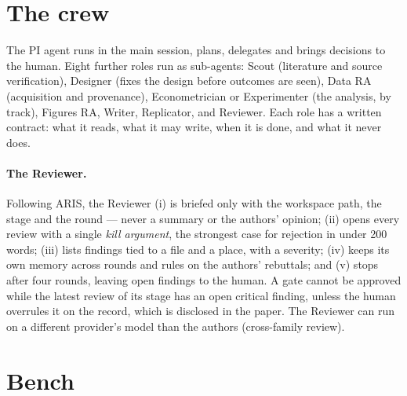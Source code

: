 \documentclass[11pt]{article}
\begin{document}
\section{The crew}\label{sec:crew}

The PI agent runs in the main session, plans, delegates and brings decisions to the
human. Eight further roles run as sub-agents: Scout (literature and source
verification), Designer (fixes the design before outcomes are seen), Data RA
(acquisition and provenance), Econometrician or Experimenter (the analysis, by track),
Figures RA, Writer, Replicator, and Reviewer. Each role has a written contract: what it
reads, what it may write, when it is done, and what it never does.

\paragraph{The Reviewer.} Following ARIS, the Reviewer (i) is briefed only with the
workspace path, the stage and the round --- never a summary or the authors' opinion;
(ii) opens every review with a single \emph{kill argument}, the strongest case for
rejection in under 200 words; (iii) lists findings tied to a file and a place, with a
severity; (iv) keeps its own memory across rounds and rules on the authors' rebuttals;
and (v) stops after four rounds, leaving open findings to the human. A gate cannot be
approved while the latest review of its stage has an open critical finding, unless the
human overrules it on the record, which is disclosed in the paper. The Reviewer can run
on a different provider's model than the authors (cross-family review).

\section{Bench}\label{sec:bench}
\end{document}
